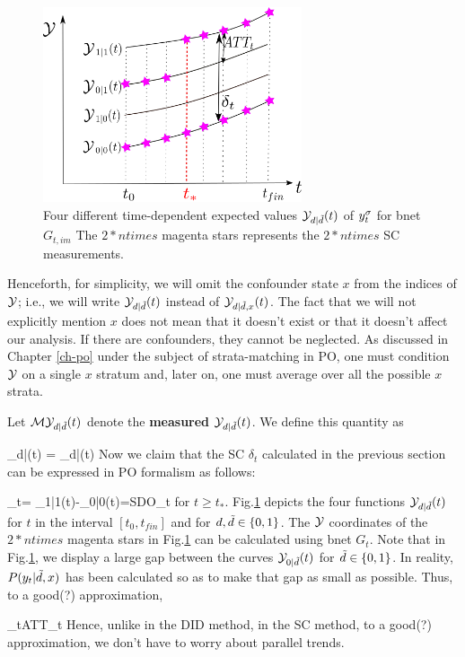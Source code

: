 \begin{figure}[h!]
\centering
\includegraphics[width=3in]
{syn-con/syn-con-bc.png}
\caption{Four different time-dependent
expected 
values ${\cal Y}_{d|{\tilde{d}}}(t)$ of $y^\sigma_t$
for bnet $G_{t, im}$
The $2*ntimes$ magenta  stars
represents the $2*ntimes$ SC measurements.} 
\label{fig-syn-con-bc}
\end{figure}

Henceforth, 
for simplicity, we will
omit the confounder state $x$
from the indices of ${\cal Y}$; i.e., we will write
${\cal Y}_{d|{\tilde{d}}}(t)$
instead of ${\cal Y}_{d|{\tilde{d}}, x}(t)$.
The fact that we will
not explicitly
mention $x$ does not
mean that it doesn't exist
or that it doesn't affect our analysis.
If there are confounders,
they cannot be neglected.
As discussed in Chapter \ref{ch-po}
under the subject of strata-matching in PO,
one must condition ${\cal Y}$
on a single $x$ stratum
and, later on,  one must average
over all the possible $x$ strata.


Let ${\cal M}{\cal Y}_{d|{\tilde{d}}}(t)$ denote the
{\bf measured ${\cal Y}_{d|{\tilde{d}}}(t)$}.
We define this quantity as

\beq
\calm\caly_{d|\td}(t)
=
\caly_{d|\td}(t)
\left[ \indi(d=0, t< t_*)+
\indi(d=\td, t\geq t_*)\right]
\eeq
Now we claim that the SC 
$\delta_t$ calculated in the 
previous section 
can be expressed in PO formalism as follows:

\beqa
\delta_t=
\caly_{1|1}(t)-\caly_{0|0}(t)=SDO_t
\;
\eeqa
for $t\geq t_*$.
Fig.\ref{fig-syn-con-bc}
depicts the
four functions
${\cal Y}_{d|{\tilde{d}}}(t)$
for $t$ in the interval  $[t_0, t_{fin}]$
and for $d,{\tilde{d}}\in \{0,1\}$.
The ${\cal Y}$ coordinates
of the $2*ntimes$ magenta stars in 
Fig.\ref{fig-syn-con-bc} can 
be calculated using bnet $G_t$.
Note that in Fig.\ref{fig-syn-con-bc},
we display a large gap
between the curves ${\cal Y}_{0|{\tilde{d}}}(t)$
for ${\tilde{d}}\in \{0,1\}$.
In reality, $P(y_t|{\tilde{d}},x)$ has been
calculated so as to make that
gap as small as possible.
Thus, to a good(?) approximation,

\beq
\delta_t\approx ATT_t
\eeq
Hence, unlike in the DID method,
in the SC method, to a good(?)
approximation, we don't have to worry
about parallel trends.